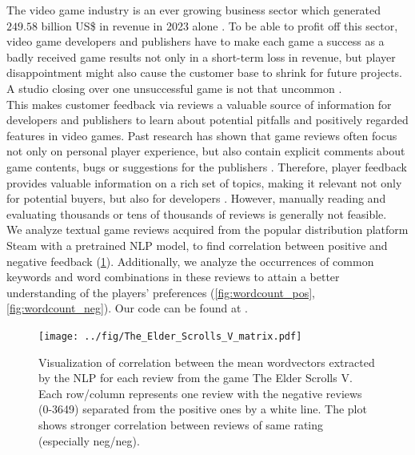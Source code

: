\documentclass{article}
\theoremstyle{plain}
\theoremstyle{definition}
\theoremstyle{remark}
\begin{document}
The video game industry is an ever growing business sector which generated $249.58$ billion US\$ in revenue in 2023 alone \cite{game_revenue}. To be able to profit off this sector, video game developers and publishers have to make each game a success as a badly received game results not only in a short-term loss in revenue, but player disappointment might also cause the customer base to shrink for future projects. A studio closing over one unsuccessful game is not that uncommon \cite{forspoken_game_studio}.
\\This makes customer feedback via reviews a valuable source of information for developers and publishers to learn about potential pitfalls and positively regarded features in video games. Past research has shown that game reviews often focus not only on personal player experience, but also contain explicit comments about game contents, bugs or suggestions for the publishers \cite{linbezemerzouhassan}. Therefore, player feedback provides valuable information on a rich set of topics, making it relevant not only for potential buyers, but also for developers \cite{zagalladdjohnson}. However, manually reading and evaluating thousands or tens of thousands of reviews is generally not feasible.\\
We analyze textual game reviews acquired from the popular distribution platform Steam \cite{steam_website} with a pretrained NLP model, to find correlation between positive and negative feedback (\ref{fig:corr-plot}). Additionally, we analyze the occurrences of common keywords and word combinations in these reviews to attain a better understanding of the players' preferences (\ref{fig:wordcount_pos}, \ref{fig:wordcount_neg}). Our code can be found at \cite{gitrepo}.

\begin{figure}%
    \centering
    \texttt{[image: ../fig/The\_Elder\_Scrolls\_V\_matrix.pdf]}
    \vspace{-4\baselineskip}
    \caption{Visualization of correlation between the mean wordvectors extracted by the NLP for each review from the game The Elder Scrolls V. Each row/column represents one review with the negative reviews (0-3649) separated from the positive ones by a white line. The plot shows stronger correlation between reviews of same rating (especially neg/neg). }
    \label{fig:corr-plot}
\end{figure}
\end{document}

